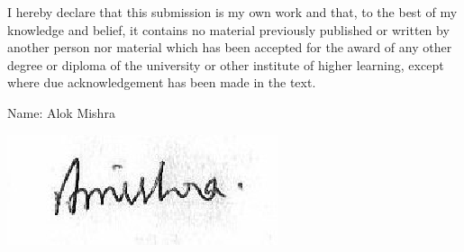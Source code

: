 \begin{declaration}

I hereby declare that this submission is my own work and that, to the best of my knowledge and belief, it contains no material previously published or written by another person nor material which has been accepted for the award of any other degree or diploma of the university or other institute of higher learning, except where due acknowledgement has been made in the text.

\vspace{1in}
Name: Alok Mishra
\vspace{0.2in}

 \includegraphics[scale=0.7]{alok_sig.eps} \hspace{2.5in}  

\end{declaration}

